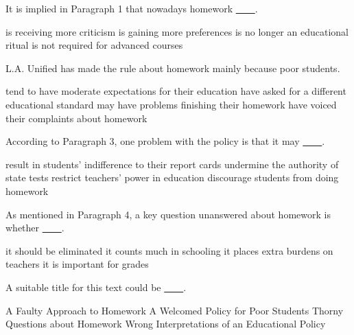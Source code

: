 \item It is implied in Paragraph 1 that nowadays homework \uline{~~~~}.
\begin{tasks}
	\task is receiving more criticism
	\task is gaining more preferences
	\task is no longer an educational ritual
	\task is not required for advanced courses
\end{tasks}
\item L.A. Unified has made the rule about homework mainly because poor students.
\begin{tasks}
	\task tend to have moderate expectations for their education
	\task have asked for a different educational standard
	\task may have problems finishing their homework
	\task have voiced their complaints about homework
\end{tasks}
\item According to Paragraph 3, one problem with the policy is that it may \uline{~~~~}.
\begin{tasks}
	\task result in students' indifference to their report cards
	\task undermine the authority of state tests
	\task restrict teachers' power in education
	\task discourage students from doing homework
\end{tasks}
\item As mentioned in Paragraph 4, a key question unanswered about homework is whether \uline{~~~~}.
\begin{tasks}
	\task it should be eliminated
	\task it counts much in schooling
	\task it places extra burdens on teachers
	\task it is important for grades
\end{tasks}
\item A suitable title for this text could be \uline{~~~~}.
\begin{tasks}
	\task A Faulty Approach to Homework
	\task A Welcomed Policy for Poor Students
	\task Thorny Questions about Homework
	\task Wrong Interpretations of an Educational Policy
\end{tasks}